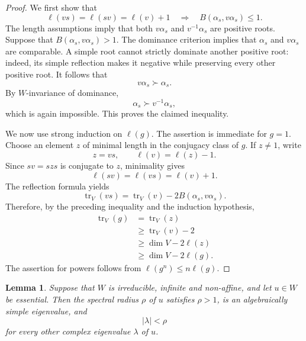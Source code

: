 \documentclass[11pt,reqno]{amsart}
\theoremstyle{plain}
\newtheorem{lemma}[theorem]{Lemma}
\theoremstyle{definition}
\theoremstyle{remark}
\numberwithin{equation}{section}
\begin{document}
\begin{proof}
We first show that
\[
\ell(vs)=\ell(sv)=\ell(v)+1
\quad\Longrightarrow\quad
B(\alpha_s,v\alpha_s)\leq1.
\]
The length assumptions imply that both $v\alpha_s$ and
$v^{-1}\alpha_s$ are positive roots.
Suppose that $B(\alpha_s,v\alpha_s)>1$.
The dominance criterion
\cite[Proposition~1.4.7(b)]{Krammer2009}
implies that $\alpha_s$ and $v\alpha_s$ are comparable.
A simple root cannot strictly dominate another positive root:
indeed, its simple reflection makes it negative while preserving
every other positive root.
It follows that
\[
v\alpha_s\succ\alpha_s.
\]
By $W$-invariance of dominance,
\[
\alpha_s\succ v^{-1}\alpha_s,
\]
which is again impossible.
This proves the claimed inequality.

We now use strong induction on $\ell(g)$.
The assertion is immediate for $g=1$.
Choose an element $z$ of minimal length in the conjugacy class
of $g$.
If $z\neq1$, write
\[
z=vs,
\qquad
\ell(v)=\ell(z)-1.
\]
Since $sv=szs$ is conjugate to $z$, minimality gives
\[
\ell(sv)=\ell(vs)=\ell(v)+1.
\]
The reflection formula yields
\[
\operatorname{tr}_V(vs)
=
\operatorname{tr}_V(v)-2B(\alpha_s,v\alpha_s).
\]
Therefore, by the preceding inequality and the induction
hypothesis,
\[
\begin{aligned}
\operatorname{tr}_V(g)
&=\operatorname{tr}_V(z)\\
&\geq\operatorname{tr}_V(v)-2\\
&\geq\dim V-2\ell(z)\\
&\geq\dim V-2\ell(g).
\end{aligned}
\]
The assertion for powers follows from
$\ell(g^n)\leq n\ell(g)$.
\end{proof}

\begin{lemma}
\label{lem:periodic-strict-gap}
Suppose that $W$ is irreducible, infinite and non-affine,
and let $u\in W$ be essential.
Then the spectral radius $\rho$ of $u$ satisfies $\rho>1$,
is an algebraically simple eigenvalue, and
\[
|\lambda|<\rho
\]
for every other complex eigenvalue $\lambda$ of $u$.
\end{lemma}
\end{document}
